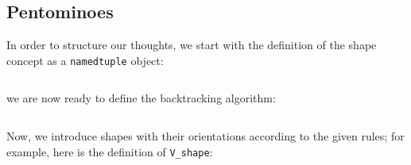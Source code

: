 \subsection{Pentominoes}

In order to structure our thoughts, we start with the definition of the shape
concept as a \verb|namedtuple| object:
\inputminted[fontsize=\small,stripnl=false,firstline=4, lastline=6]{python}{backtracking/polyominoes.py}
we are now ready to define the backtracking algorithm:
\newpage
\inputminted[fontsize=\small,stripnl=false,firstline=8, lastline=57]{python}{backtracking/polyominoes.py}

Now, we introduce shapes with their orientations according to the given rules;
for example, here is the definition of \verb|V_shape|:
\inputminted[fontsize=\small,stripnl=false,firstline=190, lastline=202]{python}{backtracking/polyominoes.py}

